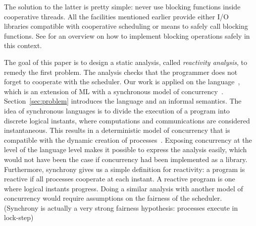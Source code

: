 \documentclass[9pt,preprint]{sigplanconf}
\begin{document}

The solution to the latter is pretty simple: never use blocking functions inside cooperative threads. All the facilities mentioned earlier provide either I/O libraries compatible with cooperative scheduling or means to safely call blocking functions. See \cite{Marlow:2004} for an overview on how to implement blocking operations safely in this context.


The goal of this paper is to design a static analysis, called \emph{reactivity analysis}, to remedy the first problem. The analysis checks that the programmer does not forget to cooperate with the scheduler.
%
Our work is applied on the \rml language~\cite{Mandel:2005}, which is an extension of ML with a synchronous model of concurrency~\cite{Benveniste:2003}. Section~\ref{sec:problem} introduces the language and an informal semantics. The idea of synchronous languages is to divide the execution of a program into discrete logical instants, where computations and communications are considered instantaneous. This results in a deterministic model of concurrency that is compatible with the dynamic creation of processes~\cite{Boussinot:1991}. Exposing concurrency at the level of the language level makes it possible to express the analysis easily, which would not have been the case if concurrency had been implemented as a library. Furthermore, synchrony gives us a simple definition for reactivity: a program is reactive if all processes cooperate at each instant. A reactive \rml program is one where logical instants progress. Doing a similar analysis with another model of concurrency would require assumptions on the fairness of the scheduler. (Synchrony is actually a very strong fairness hypothesis: processes execute in lock-step)
\end{document}
